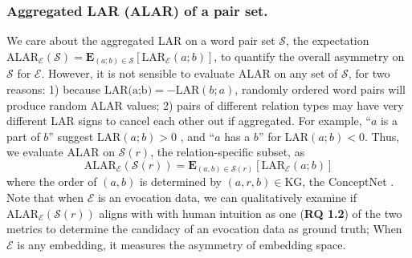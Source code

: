 \documentclass[letterpaper]{article} %
\begin{document}
\subsubsection{Aggregated LAR (ALAR) of a pair set.}
We care about the aggregated LAR on a word pair set $\mathcal{S}$, the expectation
$    \mbox{ALAR}_\mathcal{E}(\mathcal{S}) = \mathbf{E}_{(a;b)\in \mathcal{S}} [\mbox{LAR}_\mathcal{E}(a;b)]
$, to quantify the overall asymmetry on $\mathcal{S}$ for $\mathcal{E}$. However, it is not sensible to evaluate ALAR on any set of $\mathcal{S}$, for two reasons:  1) because $\text{LAR(a;b)} = - \text{LAR}(b;a)$, randomly ordered word pairs will produce random ALAR values; 2) pairs of different relation types may have very different LAR signs to cancel each other out if aggregated. For example, ``$a$ is a part of $b$'' suggest LAR$(a;b)>0$
, and ``$a$ has a $b$'' for LAR$(a;b)< 0$. Thus, we evaluate ALAR on $\mathcal{S}(r)$, the relation-specific subset, as
\begin{equation}
    \label{eq:alar}
    \mbox{ALAR}_\mathcal{E}(\mathcal{S}(r)) = \mathbf{E}_{(a,b)\in { \mathcal{S}(r)} } [\mbox{LAR}_\mathcal{E}(a;b)]
\end{equation}
where the order of $(a,b)$ is determined by $(a,r,b)\in \mbox{KG}$, the ConceptNet \cite{speer2017conceptnet}. Note that when $\mathcal{E}$ is an evocation data, we can qualitatively examine if $\mbox{ALAR}_\mathcal{E}(\mathcal{S}(r))$ aligns with with human intuition as one (\textbf{RQ 1.2}) of the two metrics to determine the candidacy of an evocation data as ground truth; When $\mathcal{E}$ is any embedding, it measures the asymmetry of embedding space.
\end{document}

